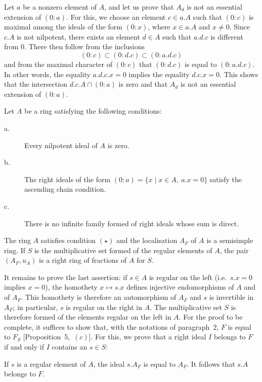 Let $a$ be a nonzero element of $A$, and let us prove that $A_d$ is not
an essential extension of $(0:a)$. For this, we choose an element
$c\in a.A$ such that $(0:c)$ is maximal among the ideals of the form
$(0:x)$, where $x\in a.A$ and $x\ne 0$. Since $c.A$ is not nilpotent,
there exists an element $d\in A$ such that $a.d.c$ is different from $0$.
There then follow from the inclusions
\[
(0:c)\subset(0:d.c)\subset(0:a.d.c)
\]
and from the maximal character of $(0:c)$ that $(0:d.c)$ is equal to
$(0:a.d.c)$. In other words, the equality $a.d.c.x=0$ implies the
equality $d.c.x=0$. This shows that the intersection
$d.c.A\cap(0:a)$ is zero and that $A_d$ is not an essential extension
of $(0:a)$.

\begin{theorem}[Goldie]
Let $A$ be a ring satisfying the following conditions:
\begin{description}
\item[\normalfont a.] Every nilpotent ideal of $A$ is zero.
\item[\normalfont b.] The right ideals of the form
$(0:a)=\{x\mid x\in A,\ a.x=0\}$ satisfy the ascending chain condition.
\item[\normalfont c.] There is no infinite family formed of right ideals
whose sum is direct.
\end{description}
The ring $A$ satisfies condition $(\star)$ and the localisation $A_F$
of $A$ is a semisimple ring. If $S$ is the multiplicative set formed of
the regular elements of $A$, the pair $(A_F,u_A)$ is a right ring of
fractions of $A$ for $S$.
\end{theorem}

It remains to prove the last assertion: if $s\in A$ is regular on the
left (i.e.\ $s.x=0$ implies $x=0$), the homothety $x\mapsto s.x$ defines
injective endomorphisms of $A$ and of $A_F$. This homothety is therefore
an automorphism of $A_F$ and $s$ is invertible in $A_F$; in particular,
$s$ is regular on the right in $A$. The multiplicative set $S$ is
therefore formed of the elements regular on the left in $A$. For the
proof to be complete, it suffices to show that, with the notations of
paragraph~2, $F$ is equal to $F_S$ [Proposition~5,~$(c)$]. For this, we
prove that a right ideal $I$ belongs to $F$ if and only if $I$ contains
an $s\in S$:

If $s$ is a regular element of $A$, the ideal $s.A_F$ is equal to
$A_F$. It follows that $s.A$ belongs to $F$.

